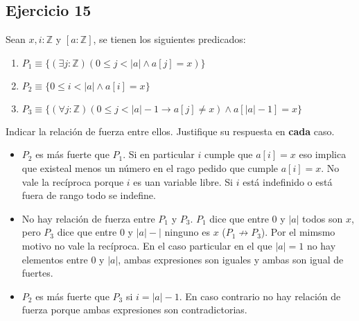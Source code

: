 \documentclass[10pt,a4paper]{article}
\begin{document}
\subsection*{Ejercicio 15}
Sean $x, i : \mathbb{Z}$ y $[a : \mathbb{Z}]$, se tienen los siguientes predicados:
\begin{enumerate}
\item $P_{1} \equiv \{(\exists j : \mathbb{Z})(0 \leq j < |a| \wedge a[j] = x)\}$
\item $P_{2} \equiv \{0 \leq i < |a| \wedge a[i] = x\}$
\item $P_{3} \equiv \{(\forall j : \mathbb{Z})(0 \leq j < |a| - 1 \rightarrow a[j] \not = x) \wedge a[|a| - 1] = x\}$
\end{enumerate}
Indicar la relación de fuerza entre ellos. Justifique su respuesta en \textbf{cada} caso.
\begin{itemize}
\item $P_{2}$ es más fuerte que $P_{1}$. Si en particular $i$ cumple que $a[i]=x$ eso implica que existeal menos un número en el rago pedido que cumple $a[i]=x$. No vale la recíproca porque $i$ es uan variable libre. Si $i$ está indefinido o está fuera de rango todo se indefine.
\item No hay relación de fuerza entre $P_{1}$ y $P_{3}$. $P_{1}$ dice que entre 0 y $|a|$ todos son $x$, pero $P_{3}$ dice que entre 0 y $|a|-|$ ninguno es $x$ ($P_{1}\not \rightarrow P_{3}$). Por el mimsmo motivo no vale la recíproca. En el caso particular en el que $|a|=1$ no hay elementos entre 0 y $|a|$, ambas expresiones son iguales y ambas son igual de fuertes.
\item $P_{2}$ es más fuerte que $P_{3}$ si $i=|a|-1$. En caso contrario no hay relación de fuerza porque ambas expresiones son contradictorias.
\end{itemize}
\end{document}
